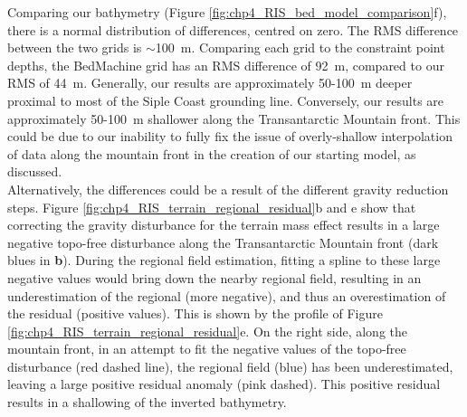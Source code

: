Comparing our bathymetry (Figure \ref{fig:chp4_RIS_bed_model_comparison}f), there is a normal distribution of differences, centred on zero. The RMS difference between the two grids is $\sim$100~m. Comparing each grid to the constraint point depths, the BedMachine grid has an RMS difference of 92~m, compared to our RMS of 44~m. Generally, our results are approximately 50-100~m deeper proximal to most of the Siple Coast grounding line. Conversely, our results are approximately 50-100~m shallower along the Transantarctic Mountain front. This could be due to our inability to fully fix the issue of overly-shallow interpolation of data along the mountain front in the creation of our starting model, as discussed.\\

Alternatively, the differences could be a result of the different gravity reduction steps. Figure \ref{fig:chp4_RIS_terrain_regional_residual}b and e show that correcting the gravity disturbance for the terrain mass effect results in a large negative topo-free disturbance along the Transantarctic Mountain front (dark blues in \textbf{b}). During the regional field estimation, fitting a spline to these large negative values would bring down the nearby regional field, resulting in an underestimation of the regional (more negative), and thus an overestimation of the residual (positive values). This is shown by the profile of Figure \ref{fig:chp4_RIS_terrain_regional_residual}e. On the right side, along the mountain front, in an attempt to fit the negative values of the topo-free disturbance (red dashed line), the regional field (blue) has been underestimated, leaving a large positive residual anomaly (pink dashed). This positive residual results in a shallowing of the inverted bathymetry.\\

